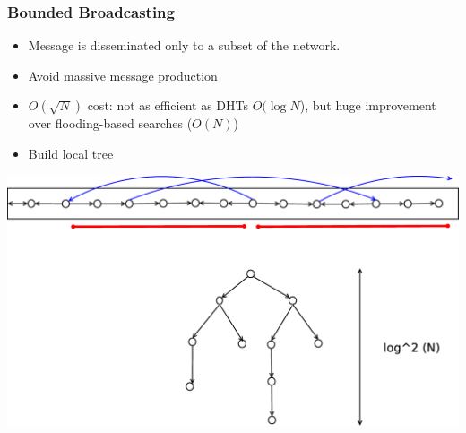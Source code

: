 \documentclass[red]{beamer}
\begin{document}
\begin{frame}
\frametitle{Bounded Broadcasting}
\begin{itemize}
\item
Message is disseminated only to a subset of the network.
\item
Avoid massive message production
\item $O(\sqrt{N})$ cost: not as efficient as DHTs $O(\log {N}$), but huge improvement over flooding-based searches ($O(N)$)
\item Build local tree
\end{itemize}
\centering
\includegraphics[scale=0.1]{figs/multi}

\end{frame}

\end{document}
